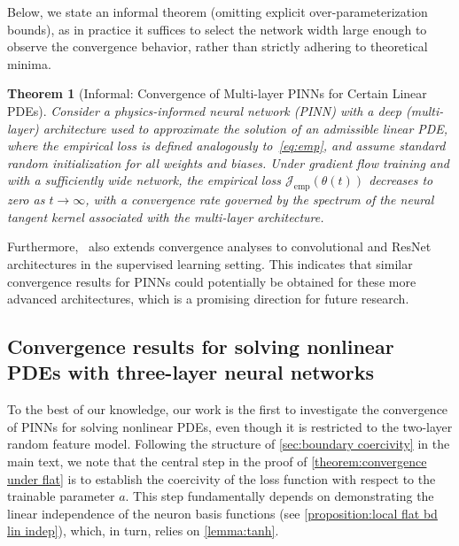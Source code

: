 \documentclass{article}
\newtheorem{theorem}{Theorem}
\begin{document}
Below, we state an informal theorem (omitting explicit over-parameterization bounds), as in practice it suffices to select the network width large enough to observe the convergence behavior, rather than strictly adhering to theoretical minima.
\begin{theorem}[Informal: Convergence of Multi-layer PINNs for Certain Linear PDEs]
Consider a physics-informed neural network (PINN) with a deep (multi-layer) architecture used to approximate the solution of an admissible linear PDE, where the empirical loss is defined analogously to~\cref{eq:emp}, 
and assume standard random initialization for all weights and biases. 
Under gradient flow training and with a sufficiently wide network, the empirical loss $\mathcal{J}_{\mathrm{emp}}(\theta(t))$ decreases to zero as $t \to \infty$, with a convergence rate governed by the spectrum of the neural tangent kernel associated with the multi-layer architecture.
\end{theorem}
Furthermore,~\cite{du2018gradient} also extends convergence analyses to convolutional and ResNet architectures in the supervised learning setting. 
This indicates that similar convergence results for PINNs could potentially be obtained for these more advanced architectures, which is a promising direction for future research.

\subsection{Convergence results for solving nonlinear PDEs with three-layer neural networks}\label{sec:deeper nonlinear}
To the best of our knowledge, our work is the first to investigate the convergence of PINNs for solving nonlinear PDEs, even though it is restricted to the two-layer random feature model. 
Following the structure of \cref{sec:boundary coercivity} in the main text, we note that the central step in the proof of \cref{theorem:convergence under flat} is to establish the coercivity of the loss function with respect to the trainable parameter $a$. 
This step fundamentally depends on demonstrating the linear independence of the neuron basis functions (see \cref{proposition:local flat bd lin indep}), which, in turn, relies on \cref{lemma:tanh}.
\end{document}
